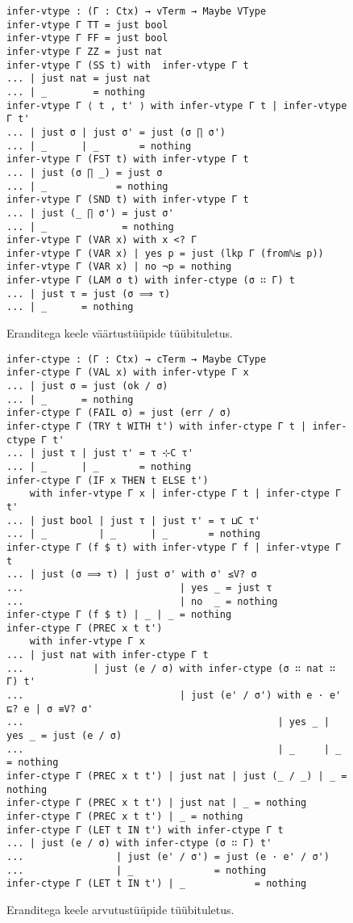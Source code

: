 \documentclass[a4paper,12pt]{article}
\begin{document}
\begin{figure}
  \begin{verbatim}
infer-vtype : (Γ : Ctx) → vTerm → Maybe VType
infer-vtype Γ TT = just bool
infer-vtype Γ FF = just bool
infer-vtype Γ ZZ = just nat
infer-vtype Γ (SS t) with  infer-vtype Γ t
... | just nat = just nat
... | _        = nothing
infer-vtype Γ ⟨ t , t' ⟩ with infer-vtype Γ t | infer-vtype Γ t'
... | just σ | just σ' = just (σ ∏ σ')
... | _      | _       = nothing
infer-vtype Γ (FST t) with infer-vtype Γ t
... | just (σ ∏ _) = just σ
... | _            = nothing
infer-vtype Γ (SND t) with infer-vtype Γ t
... | just (_ ∏ σ') = just σ'
... | _             = nothing
infer-vtype Γ (VAR x) with x <? Γ
infer-vtype Γ (VAR x) | yes p = just (lkp Γ (fromℕ≤ p))
infer-vtype Γ (VAR x) | no ¬p = nothing
infer-vtype Γ (LAM σ t) with infer-ctype (σ ∷ Γ) t
... | just τ = just (σ ⟹ τ)
... | _      = nothing\end{verbatim}
  \caption{Eranditega keele väärtustüüpide tüübituletus.}
  \label{fig:exc.infer-vtype}
\end{figure}

\begin{figure}
  \begin{verbatim}
infer-ctype : (Γ : Ctx) → cTerm → Maybe CType
infer-ctype Γ (VAL x) with infer-vtype Γ x
... | just σ = just (ok / σ)
... | _      = nothing
infer-ctype Γ (FAIL σ) = just (err / σ)
infer-ctype Γ (TRY t WITH t') with infer-ctype Γ t | infer-ctype Γ t'
... | just τ | just τ' = τ ⊹C τ'
... | _      | _       = nothing
infer-ctype Γ (IF x THEN t ELSE t')
    with infer-vtype Γ x | infer-ctype Γ t | infer-ctype Γ t'
... | just bool | just τ | just τ' = τ ⊔C τ'
... | _         | _      | _       = nothing
infer-ctype Γ (f $ t) with infer-vtype Γ f | infer-vtype Γ t
... | just (σ ⟹ τ) | just σ' with σ' ≤V? σ
...                           | yes _ = just τ
...                           | no  _ = nothing
infer-ctype Γ (f $ t) | _ | _ = nothing
infer-ctype Γ (PREC x t t')
    with infer-vtype Γ x
... | just nat with infer-ctype Γ t
...            | just (e / σ) with infer-ctype (σ ∷ nat ∷ Γ) t'
...                           | just (e' / σ') with e · e' ⊑? e | σ ≡V? σ'
...                                            | yes _ | yes _ = just (e / σ)
...                                            | _     | _     = nothing
infer-ctype Γ (PREC x t t') | just nat | just (_ / _) | _ = nothing
infer-ctype Γ (PREC x t t') | just nat | _ = nothing
infer-ctype Γ (PREC x t t') | _ = nothing
infer-ctype Γ (LET t IN t') with infer-ctype Γ t 
... | just (e / σ) with infer-ctype (σ ∷ Γ) t'
...                | just (e' / σ') = just (e · e' / σ')
...                | _              = nothing
infer-ctype Γ (LET t IN t') | _            = nothing\end{verbatim}
  \caption{Eranditega keele arvutustüüpide tüübituletus.}
  \label{fig:exc.infer-ctype}
\end{figure}
\end{document}

